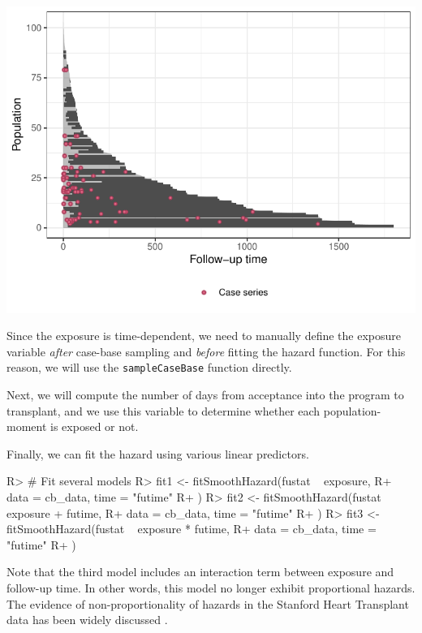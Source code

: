 \documentclass[
]{jss}
\begin{document}
\begin{CodeChunk}


\begin{center}\includegraphics[width=\textwidth,keepaspectratio=true]{../figures/stanford-poptime-1} \end{center}

\end{CodeChunk}

Since the exposure is time-dependent, we need to manually define the
exposure variable \emph{after} case-base sampling and \emph{before}
fitting the hazard function. For this reason, we will use the
\texttt{sampleCaseBase} function directly.

Next, we will compute the number of days from acceptance into the
program to transplant, and we use this variable to determine whether
each population-moment is exposed or not.

Finally, we can fit the hazard using various linear predictors.

\begin{CodeChunk}

\begin{CodeInput}
R> # Fit several models
R> fit1 <- fitSmoothHazard(fustat ~ exposure,
R+   data = cb_data, time = "futime"
R+ )
R> fit2 <- fitSmoothHazard(fustat ~ exposure + futime,
R+   data = cb_data, time = "futime"
R+ )
R> fit3 <- fitSmoothHazard(fustat ~ exposure * futime,
R+   data = cb_data, time = "futime"
R+ )
\end{CodeInput}
\end{CodeChunk}

Note that the third model includes an interaction term between exposure
and follow-up time. In other words, this model no longer exhibit
proportional hazards. The evidence of non-proportionality of hazards in
the Stanford Heart Transplant data has been widely discussed
\citep{arjas1988graphical}.
\end{document}

